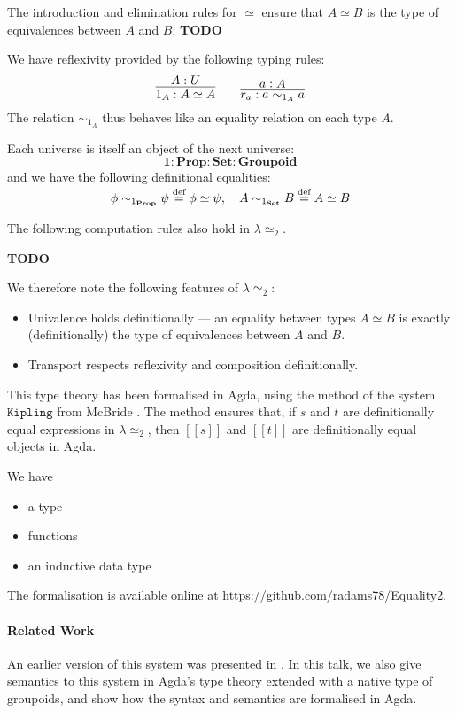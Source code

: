 \documentclass{easychair}
\newcommand{\Prop}{\ensuremath{\mathbf{Prop}}}
\newcommand{\Set}{\ensuremath{\mathbf{Set}}}
\newcommand{\Groupoid}{\ensuremath{\mathbf{Groupoid}}}
\newcommand{\LEtwo}{\ensuremath{\lambda \simeq_2}}
\newcommand{\eqdef}{\mathrel{\smash{\stackrel{\text{def}}{=}}}}
\newcommand{\brackets}[1]{\ensuremath{[ \! [ {#1} ] \! ]}}
\begin{document}
The introduction and elimination rules for $\simeq$ ensure that $A \simeq B$ is the type of equivalences between $A$ and $B$:
\textbf{TODO}

We have reflexivity provided by the following typing rules:
\[ \infer{1_A : A \simeq A}{A : U} \qquad \infer{r_a : a \sim_{1_A} a}{a : A} \]
The relation $\sim_{1_A}$ thus behaves like an equality relation on each type $A$.

Each universe is itself an object of the next universe:
\[ \mathbf{1} : \Prop : \Set : \Groupoid \]
and we have the following definitional equalities:
\[ \phi \sim_{1_\Prop} \psi \eqdef \phi \simeq \psi, \quad
A \sim_{1_\Set} B \eqdef A \simeq B \]

The following computation rules also hold in $\LEtwo$.

\textbf{TODO}

We therefore note the following features of $\LEtwo$:
\begin{itemize}
\item
Univalence holds definitionally --- an equality between types $A \simeq B$ is exactly (definitionally) the type of equivalences between $A$ and $B$.
\item
Transport respects reflexivity and composition definitionally.
\end{itemize}

This type theory has been formalised in Agda, using the method of the system $\mathtt{Kipling}$ from McBride \cite{McBridea}.  The method ensures that, if $s$ and $t$ are definitionally equal expressions in $\lambda \simeq_2$, then $\brackets{s}$ and $\brackets{t}$ are definitionally equal objects in Agda.

We have
\begin{itemize}
\item
a type 
\item
functions
\item
an inductive data type
\end{itemize}

The formalisation is available online at \url{https://github.com/radams78/Equality2}.

\paragraph{Related Work}

An earlier version of this system was presented in \cite{ap:tsnhu}.  In this talk, we also give semantics to this system in Agda's type theory extended with a native type of groupoids, and show how the syntax and semantics are formalised in Agda.
\end{document}
